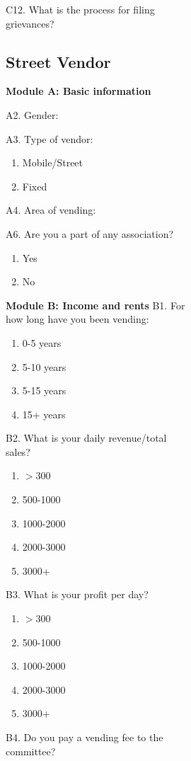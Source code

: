 \documentclass[a4paper, 12pt, twoside]{article}
\begin{document}
\begin{figure}
{\begin{figure}
\begin{figure}
\begin{mdframed}[backgroundcolor=gray!20]
C12. What is the process for filing grievances?
\end{mdframed}

\begin{mdframed}[backgroundcolor=gray!20]
\subsection*{Street Vendor}
\textbf{Module A: Basic information}

A2. Gender:

A3. Type of vendor:
\begin{enumerate}[nosep]
\item Mobile/Street
\item Fixed
\end{enumerate}

A4. Area of vending:


A6. Are you a part of any association?
\begin{enumerate}[nosep]
\item Yes
\item No
\end{enumerate}
\textbf{Module B: Income and rents}
B1. For how long have you been vending:
\begin{enumerate}[nosep]
\item 0-5 years
\item 5-10 years
\item 5-15 years
\item 15+ years
\end{enumerate}

B2. What is your daily revenue/total sales?
\begin{enumerate}[nosep]
\item $>$300
\item 500-1000
\item 1000-2000
\item 2000-3000
\item 3000+
\end{enumerate}

B3. What is your profit per day?
\begin{enumerate}[nosep]
\item $>$300
\item 500-1000
\item 1000-2000
\item 2000-3000
\item 3000+
\end{enumerate}

B4. Do you pay a vending fee to the committee?


\end{mdframed}
\end{figure}
\end{figure}}
\end{figure}
\end{document}
